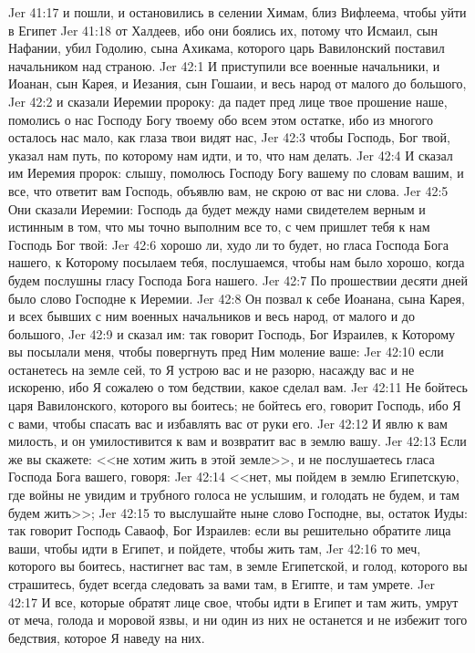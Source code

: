 \vs Jer 41:17 и пошли, и остановились в селении Химам, близ Вифлеема, чтобы уйти в Египет
\vs Jer 41:18 от Халдеев, ибо они боялись их, потому что Исмаил, сын Нафании, убил Годолию, сына Ахикама, которого царь Вавилонский поставил начальником над страною.
\vs Jer 42:1 И приступили все военные начальники, и Иоанан, сын Карея, и Иезания, сын Гошаии, и весь народ от малого до большого,
\vs Jer 42:2 и сказали Иеремии пророку: да падет пред лице твое прошение наше, помолись о нас Господу Богу твоему обо всем этом остатке, ибо из многого осталось нас мало, как глаза твои видят нас,
\vs Jer 42:3 чтобы Господь, Бог твой, указал нам путь, по которому нам идти, и то, что нам делать.
\vs Jer 42:4 И сказал им Иеремия пророк: слышу, помолюсь Господу Богу вашему по словам вашим, и все, что ответит вам Господь, объявлю вам, не скрою от вас ни слова.
\vs Jer 42:5 Они сказали Иеремии: Господь да будет между нами свидетелем верным и истинным в том, что мы точно выполним все то, с чем пришлет тебя к нам Господь Бог твой:
\vs Jer 42:6 хорошо ли, худо ли то будет, но гласа Господа Бога нашего, к Которому посылаем тебя, послушаемся, чтобы нам было хорошо, когда будем послушны гласу Господа Бога нашего.
\rsbpar\vs Jer 42:7 По прошествии десяти дней было слово Господне к Иеремии.
\vs Jer 42:8 Он позвал к себе Иоанана, сына Карея, и всех бывших с ним военных начальников и весь народ, от малого и до большого,
\vs Jer 42:9 и сказал им: так говорит Господь, Бог Израилев, к Которому вы посылали меня, чтобы повергнуть пред Ним моление ваше:
\vs Jer 42:10 если останетесь на земле сей, то Я устрою вас и не разорю, насажду вас и не искореню, ибо Я сожалею о том бедствии, какое сделал вам.
\vs Jer 42:11 Не бойтесь царя Вавилонского, которого вы боитесь; не бойтесь его, говорит Господь, ибо Я с вами, чтобы спасать вас и избавлять вас от руки его.
\vs Jer 42:12 И явлю к вам милость, и он умилостивится к вам и возвратит вас в землю вашу.
\vs Jer 42:13 Если же вы скажете: <<не хотим жить в этой земле>>, и не послушаетесь гласа Господа Бога вашего, говоря:
\vs Jer 42:14 <<нет, мы пойдем в землю Египетскую, где войны не увидим и трубного голоса не услышим, и голодать не будем, и там будем жить>>;
\vs Jer 42:15 то выслушайте ныне слово Господне, вы, остаток Иуды: так говорит Господь Саваоф, Бог Израилев: если вы решительно обратите лица ваши, чтобы идти в Египет, и пойдете, чтобы жить там,
\vs Jer 42:16 то меч, которого вы боитесь, настигнет вас там, в земле Египетской, и голод, которого вы страшитесь, будет всегда следовать за вами там, в Египте, и там умрете.
\vs Jer 42:17 И все, которые обратят лице свое, чтобы идти в Египет и там жить, умрут от меча, голода и моровой язвы, и ни один из них не останется и не избежит того бедствия, которое Я наведу на них.
